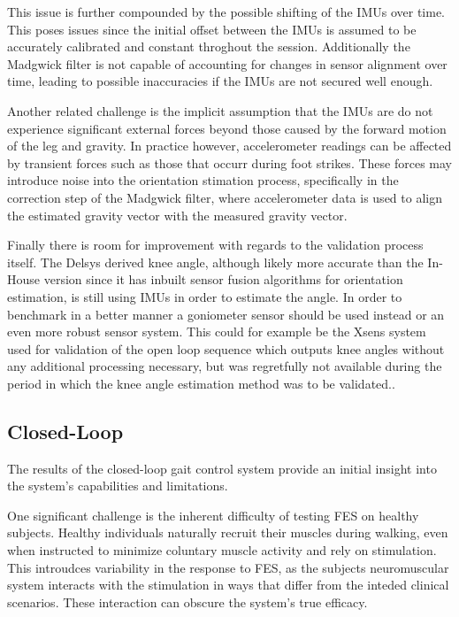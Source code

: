 This issue is further compounded by the possible shifting of the IMUs over time. This poses issues since the initial offset between the IMUs is assumed to be accurately calibrated and constant throghout the session. Additionally the Madgwick filter is not capable of accounting for changes in sensor alignment over time, leading to possible inaccuracies if the IMUs are not secured well enough.

Another related challenge is the implicit assumption that the IMUs are do not experience significant external forces beyond those caused by the forward motion of the leg and gravity. In practice however, accelerometer readings can be affected by transient forces such as those that occurr during foot strikes. These forces may introduce noise into the orientation stimation process, specifically in the correction step of the Madgwick filter, where accelerometer data is used to align the estimated gravity vector with the measured gravity vector.

Finally there is room for improvement with regards to the validation process itself. The Delsys derived knee angle, although likely more accurate than the In-House version since it has inbuilt sensor fusion algorithms for orientation estimation, is still using IMUs in order to estimate the angle. In order to benchmark in a better manner a goniometer sensor should be used instead or an even more robust sensor system. This could for example be the Xsens system used for validation of the open loop sequence which outputs knee angles without any additional processing necessary, but was regretfully not available during the period in which the knee angle estimation method was to be validated.. 

\subsection{Closed-Loop}

The results of the closed-loop gait control system provide an initial insight into the system's capabilities and limitations. 

One significant challenge is the inherent difficulty of testing FES on healthy subjects. Healthy individuals naturally recruit their muscles during walking, even when instructed to minimize coluntary muscle activity and rely on stimulation. This introudces variability in the response to FES, as the subjects neuromuscular system interacts with the stimulation in ways that differ from the inteded clinical scenarios. These interaction can obscure the system's true efficacy.

